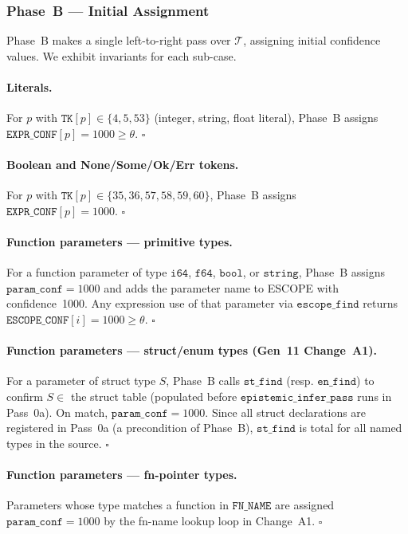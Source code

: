\subsubsection*{Phase~B — Initial Assignment}

Phase~B makes a single left-to-right pass over $\mathcal{T}$, assigning initial
confidence values. We exhibit invariants for each sub-case.

\paragraph{Literals.}
For $p$ with $\mathtt{TK}[p] \in \{4, 5, 53\}$ (integer, string, float literal),
Phase~B assigns $\mathtt{EXPR\_CONF}[p] = 1000 \geq \theta$. $\square$

\paragraph{Boolean and None/Some/Ok/Err tokens.}
For $p$ with $\mathtt{TK}[p] \in \{35, 36, 57, 58, 59, 60\}$,
Phase~B assigns $\mathtt{EXPR\_CONF}[p] = 1000$. $\square$

\paragraph{Function parameters — primitive types.}
For a function parameter of type $\mathtt{i64}$, $\mathtt{f64}$, $\mathtt{bool}$,
or $\mathtt{string}$, Phase~B assigns $\mathtt{param\_conf} = 1000$ and adds
the parameter name to ESCOPE with confidence~1000.
Any expression use of that parameter via $\mathtt{escope\_find}$ returns
$\mathtt{ESCOPE\_CONF}[i] = 1000 \geq \theta$. $\square$

\paragraph{Function parameters — struct/enum types (Gen~11 Change~A1).}
For a parameter of struct type $S$, Phase~B calls $\mathtt{st\_find}$ (resp.
$\mathtt{en\_find}$) to confirm $S \in$ the struct table (populated before
$\mathtt{epistemic\_infer\_pass}$ runs in Pass~0a).
On match, $\mathtt{param\_conf} = 1000$.
Since all struct declarations are registered in Pass~0a (a precondition
of Phase~B), $\mathtt{st\_find}$ is total for all named types in the
source. $\square$

\paragraph{Function parameters — fn-pointer types.}
Parameters whose type matches a function in $\mathtt{FN\_NAME}$
are assigned $\mathtt{param\_conf} = 1000$ by the fn-name lookup
loop in Change~A1. $\square$

